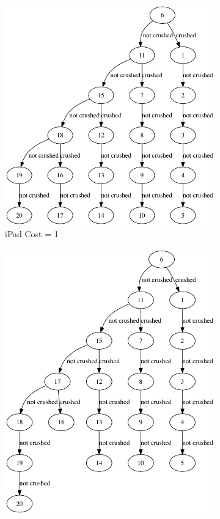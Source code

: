 \documentclass[12pt,a4paper,oneside]{report}
\begin{document}
\begin{figure}[H]
\begin{subfigure}{0.3\textwidth}
		\includegraphics[width=\textwidth]{fixed_cost_1}
		\caption{iPad Cost = 1}
		\label{fig:fixed_cost_1}
	\end{subfigure}
	\begin{subfigure}{0.3\textwidth}
		\includegraphics[width=\textwidth]{fixed_cost_2}

\end{subfigure}
\end{figure}
\end{document}
